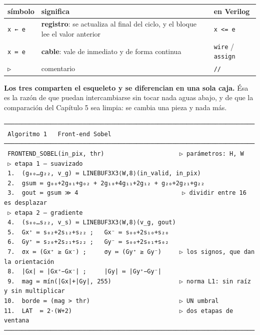 \begin{longtable}[]{@{}
  >{\centering\arraybackslash}p{}
  >{\raggedright\arraybackslash}p{}
  >{\raggedright\arraybackslash}p{}@{}}
\toprule\noalign{}
\begin{minipage}[b]{\linewidth}\centering
símbolo
\end{minipage} & \begin{minipage}[b]{\linewidth}\raggedright
significa
\end{minipage} & \begin{minipage}[b]{\linewidth}\raggedright
en Verilog
\end{minipage} \\
\midrule\noalign{}
\endhead
\bottomrule\noalign{}
\endlastfoot
\texttt{x\ ←\ e} & \textbf{registro}: se actualiza al final del ciclo, y
el bloque lee el valor anterior & \texttt{x\ \textless{}=\ e} \\
\texttt{x\ ≔\ e} & \textbf{cable}: vale de inmediato y de forma continua
& \texttt{wire} / \texttt{assign} \\
\texttt{▷} & comentario & \texttt{//} \\
\end{longtable}

\textbf{Los tres comparten el esqueleto y se diferencian en una sola
caja.} Ésa es la razón de que puedan intercambiarse sin tocar nada aguas
abajo, y de que la comparación del Capítulo 5 sea limpia: se cambia una
pieza y nada más.

\begin{verbatim}
──────────────────────────────────────────────────────────────────────
 Algoritmo 1   Front-end Sobel
──────────────────────────────────────────────────────────────────────
 FRONTEND_SOBEL(in_pix, thr)                     ▷ parámetros: H, W
 ▷ etapa 1 — suavizado
 1.  (g₀₀…g₂₂, v_g) ≔ LINEBUF3X3⟨W,8⟩(in_valid, in_pix)
 2.  gsum ≔ g₀₀+2g₀₁+g₀₂ + 2g₁₀+4g₁₁+2g₁₂ + g₂₀+2g₂₁+g₂₂
 3.  gout ≔ gsum ≫ 4                             ▷ dividir entre 16 es desplazar
 ▷ etapa 2 — gradiente
 4.  (s₀₀…s₂₂, v_s) ≔ LINEBUF3X3⟨W,8⟩(v_g, gout)
 5.  Gx⁺ ≔ s₀₂+2s₁₂+s₂₂ ;   Gx⁻ ≔ s₀₀+2s₁₀+s₂₀
 6.  Gy⁺ ≔ s₂₀+2s₂₁+s₂₂ ;   Gy⁻ ≔ s₀₀+2s₀₁+s₀₂
 7.  σx ≔ (Gx⁺ ≥ Gx⁻) ;     σy ≔ (Gy⁺ ≥ Gy⁻)     ▷ los signos, que dan la orientación
 8.  |Gx| ≔ |Gx⁺−Gx⁻| ;     |Gy| ≔ |Gy⁺−Gy⁻|
 9.  mag ≔ mín(|Gx|+|Gy|, 255)                   ▷ norma L1: sin raíz y sin multiplicar
10.  borde ≔ (mag > thr)                         ▷ UN umbral
11.  LAT  ≔ 2·(W+2)                              ▷ dos etapas de ventana
──────────────────────────────────────────────────────────────────────
\end{verbatim}

